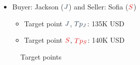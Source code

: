\documentclass[
  ignorenonframetext,
]{beamer}
\providecommand{\tightlist}{%
  \setlength{\itemsep}{0pt}\setlength{\parskip}{0pt}}\usepackage{longtable,booktabs,array}
\begin{document}
\begin{frame}{}
\label{section-4}

\begin{itemize}
\item
  Buyer: Jackson (\(\color{blue}{J}\)) and Seller: Sofia
  (\(\color{red}{S}\))

  \begin{itemize}
  \tightlist
  \item
    Target point \(\color{blue}{J}\), \(\color{blue}{Tp_J}\): 135K USD
  \item
    Target point \(\color{red}{S}\), \(\color{red}{Tp_S}\): 140K USD
  \end{itemize}
\end{itemize}

\begin{figure}


\caption{\label{fig-target-point}Target points}

\end{figure}%
\end{frame}
\end{document}

